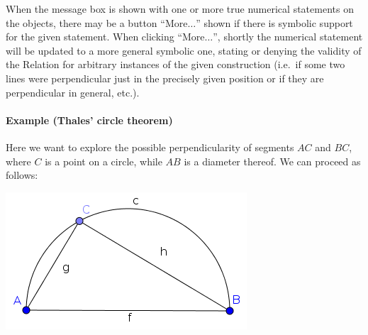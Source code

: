 \documentclass{article}
\begin{document}
When the message box is shown with one or more true numerical statements on the objects, there may be a button ``More$\ldots$'' shown if there is symbolic support for the given statement. When clicking ``More$\ldots$'', shortly the numerical statement will be updated to a more general symbolic one, stating or denying the validity of the Relation for arbitrary instances of the given construction (i.e.~if some two lines were perpendicular just in the precisely given position or if they are perpendicular in general, etc.).

\paragraph{Example (Thales' circle theorem)}\label{ex:ThalesCircleTheorem}
\label{par:Thales}
Here we want to explore the possible perpendicularity of segments $AC$ and $BC$, where $C$ is a point on a circle, while $AB$ is a diameter thereof. We can proceed as follows:
\begin{center}
\includegraphics[scale=0.5]{Relation-example}
\end{center}
\end{document}
